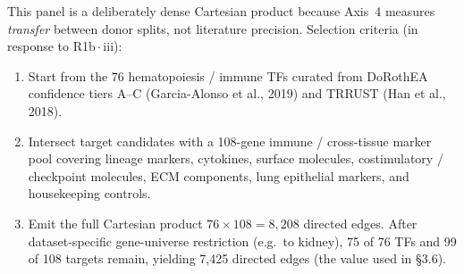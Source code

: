 \documentclass[a4paper,11pt]{article}
\begin{document}
This panel is a deliberately dense Cartesian product because Axis~4
measures \emph{transfer} between donor splits, not literature
precision. Selection criteria (in response to R1b\,$\cdot$\,iii):

\begin{enumerate}
\item Start from the 76 hematopoiesis / immune TFs curated from
  DoRothEA confidence tiers A--C (Garcia-Alonso et al., 2019) and
  TRRUST (Han et al., 2018).
\item Intersect target candidates with a 108-gene immune /
  cross-tissue marker pool covering lineage markers, cytokines,
  surface molecules, costimulatory / checkpoint molecules, ECM
  components, lung epithelial markers, and housekeeping controls.
\item Emit the full Cartesian product $76 \times 108 = 8{,}208$
  directed edges. After dataset-specific gene-universe restriction
  (e.g.\ to kidney), 75 of 76 TFs and 99 of 108 targets remain,
  yielding 7{,}425 directed edges (the value used in \S3.6).
\end{enumerate}
\end{document}
